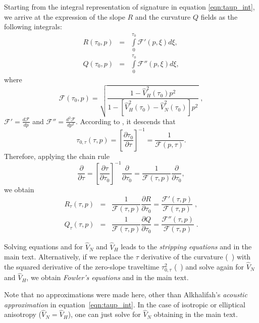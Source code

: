 
Starting from the integral representation of \taup signature in equation \ref{eqn:taup_int}, we arrive at the expression of
the slope $R$ and the curvature $Q$ fields as the following integrals:
\begin{eqnarray}
R (\tau_{0},p)&=&\int\limits_{0}^{\tau _{0}}\mathcal{F'}(p,\xi)d\xi ,\\
\label{eqn:B1}
Q (\tau_{0},p)&=&\int\limits_{0}^{\tau _{0}}\mathcal{F''}(p,\xi)d\xi ,
\label{eqn:B2}
\end{eqnarray}
where 
\[
\mathcal{F}(\tau_{0},p)=\sqrt{\frac{1-\hat{V}_{H}^{2}(\tau_{0})p^{2}}{1-[\hat{V}_{H}^{2}(\tau_{0} )-\hat{V}_{N}^{2}(\tau_{0} )]p^{2}}}\;,
\]
$\mathcal{F'}=\frac{d\mathcal{F}}{dp}$ and $\mathcal{F''}=\frac{d^2\mathcal{F}}{dp^2}$. According to , it descends that
\begin{equation}
\tau_{0,\tau} (\tau ,p) =\left[ \dfrac{\partial \tau_{0}}{\partial \tau}\right] ^{-1} =\dfrac{1}{\mathcal{F}(p,\tau)}.
\label{eqn:B3}
\end{equation}
Therefore, applying the chain rule 
\begin{equation}
\dfrac{\partial }{\partial \tau} = \left[ \dfrac{\partial \tau}{\partial \tau_{0}}\right] ^{-1} \dfrac{\partial }{\partial \tau_{0}}=\dfrac{1}{\mathcal{F}(\tau,p)}\dfrac{\partial}{ \partial \tau_{0}},
\label{eqn:B4}
\end{equation} 
we obtain
\begin{eqnarray}
R_{\tau}(\tau ,p)&=&\dfrac{1}{\mathcal{F}(\tau,p)} \dfrac{\partial R}{\partial \tau_0} =\dfrac{\mathcal{F'}(\tau ,p)}{\mathcal{F}(\tau ,p)}\;,
\label{eqn:B5} \\
Q_{\tau}(\tau ,p)&=&\dfrac{1}{\mathcal{F}(\tau,p)}\dfrac{\partial Q}{\partial \tau_0} =\dfrac{\mathcal{F''}(\tau, p)}{\mathcal{F}(\tau ,p)}\;.
\label{eqn:B6} 
\end{eqnarray} 

Solving equations  and  for $\hat{V}_N$ and $\hat{V}_H$ leads to
the \textit{stripping equations}  and
 in the main text. Alternatively, if we replace
the $\tau$ derivative of the curvature (~) with the squared
derivative of the zero-slope traveltime $\tau^2_{0,\tau}$
(~) and solve again for $\hat{V}_N$ and $\hat{V}_H$, we obtain
\textit{Fowler's equations}  and  in the
main text.

Note that no approximations were made here, other than Alkhalifah's
\textit{acoustic approximation} in equation~\ref{eqn:taup_int}. In the
case of isotropic or elliptical anisotropy
($\hat{V}_{N}=\hat{V}_{H}$), %
one can just solve  for $\hat{V}_{N}$ obtaining 
in the main text.
